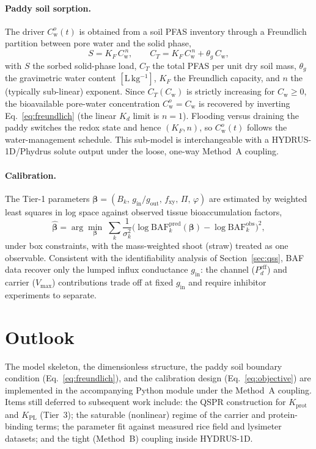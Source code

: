 \documentclass[12pt,a4paper]{article}
\newcommand{\Cw}{C_{\mathrm{w}}}
\begin{document}
\paragraph{Paddy soil sorption.}  The driver $\Cw^{o}(t)$ is obtained from a soil PFAS inventory through a Freundlich partition between pore water and the solid phase,
\begin{equation}\label{eq:freundlich}
    S=K_F\,\Cw^{\,n},\qquad
    C_T=K_F\,\Cw^{\,n}+\theta_g\,\Cw,
\end{equation}
with $S$ the sorbed solid-phase load, $C_T$ the total PFAS per unit dry soil mass, $\theta_g$ the gravimetric water content $[\mathrm{L\,kg^{-1}}]$, $K_F$ the Freundlich capacity, and $n$ the (typically sub-linear) exponent.  Since $C_T(\Cw)$ is strictly increasing for $\Cw\ge0$, the bioavailable pore-water concentration $\Cw^{o}=\Cw$ is recovered by inverting Eq.~\eqref{eq:freundlich} (the linear $K_d$ limit is $n=1$).  Flooding versus draining the paddy switches the redox state and hence $(K_F,n)$, so $\Cw^{o}(t)$ follows the water-management schedule.  This sub-model is interchangeable with a HYDRUS-1D/Phydrus solute output under the loose, one-way Method~A coupling.

\paragraph{Calibration.}  The Tier-1 parameters $\bm\beta=(B_k,\,g_\mathrm{in}/g_\mathrm{out},\,f_\mathrm{xy},\,\Pi,\,\varphi)$ are estimated by weighted least squares in log space against observed tissue bioaccumulation factors,
\begin{equation}\label{eq:objective}
    \hat{\bm\beta}=\arg\min_{\bm\beta}\;\sum_{k}\frac{1}{\sigma_k^{2}}\Big(\log\mathrm{BAF}_k^{\mathrm{pred}}(\bm\beta)-\log\mathrm{BAF}_k^{\mathrm{obs}}\Big)^{2},
\end{equation}
under box constraints, with the mass-weighted shoot (straw) treated as one observable.  Consistent with the identifiability analysis of Section~\ref{sec:qss}, BAF data recover only the lumped influx conductance $g_\mathrm{in}$: the channel ($P_d^{\mathrm{eff}}$) and carrier ($V_{\max}$) contributions trade off at fixed $g_\mathrm{in}$ and require inhibitor experiments to separate.


\section{Outlook}

The model skeleton, the dimensionless structure, the paddy soil boundary condition (Eq.~\ref{eq:freundlich}), and the calibration design (Eq.~\ref{eq:objective}) are implemented in the accompanying Python module under the Method~A coupling.  Items still deferred to subsequent work include: the QSPR construction for $K_\mathrm{prot}$ and $K_\mathrm{PL}$ (Tier~3); the saturable (nonlinear) regime of the carrier and protein-binding terms; the parameter fit against measured rice field and lysimeter datasets; and the tight (Method~B) coupling inside HYDRUS-1D.
\end{document}
